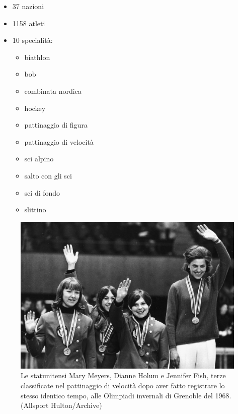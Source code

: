 \documentclass[
]{book}
\providecommand{\tightlist}{%
  \setlength{\itemsep}{0pt}\setlength{\parskip}{0pt}}
\begin{document}
\begin{itemize}
\tightlist
\item
  37 nazioni
\item
  1158 atleti
\item
  10 specialità:

  \begin{itemize}
  \tightlist
  \item
    biathlon
  \item
    bob
  \item
    combinata nordica
  \item
    hockey
  \item
    pattinaggio di figura
  \item
    pattinaggio di velocità
  \item
    sci alpino
  \item
    salto con gli sci
  \item
    sci di fondo
  \item
    slittino
  \end{itemize}
\end{itemize}

\begin{figure}
\includegraphics[width=0.8\linewidth]{images/IlPost/1968} \caption{Le statunitensi Mary Meyers, Dianne Holum e Jennifer Fish, terze classificate nel pattinaggio di velocità dopo aver fatto registrare lo stesso identico tempo, alle Olimpiadi invernali di Grenoble del 1968. (Allsport Hulton/Archive)}\label{fig:unnamed-chunk-29}
\end{figure}
\end{document}
